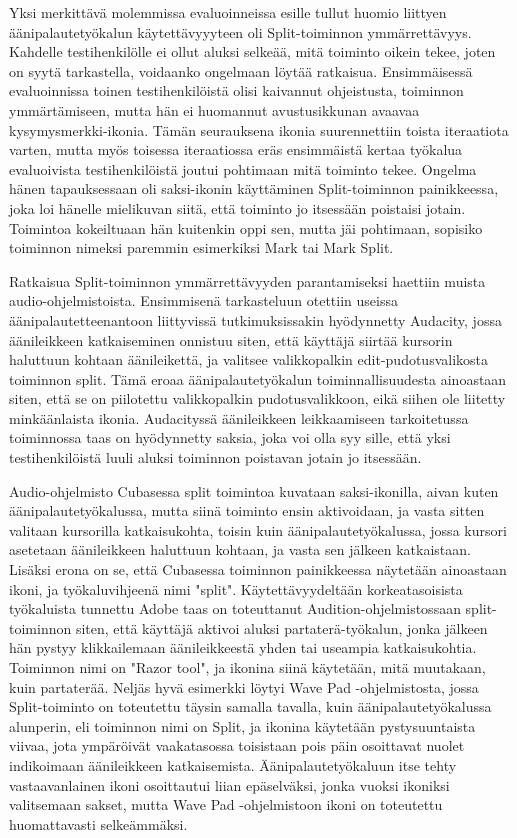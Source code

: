 \documentclass[utf8]{gradu3}
\begin{document}
Yksi merkittävä molemmissa evaluoinneissa esille tullut huomio liittyen äänipalautetyökalun käytettävyyyteen oli Split-toiminnon ymmärrettävyys. Kahdelle testihenkilölle ei ollut aluksi selkeää, mitä toiminto oikein tekee, joten on syytä tarkastella, voidaanko ongelmaan löytää ratkaisua. Ensimmäisessä evaluoinnissa toinen testihenkilöistä olisi kaivannut ohjeistusta, toiminnon ymmärtämiseen, mutta hän ei huomannut avustusikkunan avaavaa kysymysmerkki-ikonia. Tämän seurauksena ikonia suurennettiin toista iteraatiota varten, mutta myös toisessa iteraatiossa eräs ensimmäistä kertaa työkalua evaluoivista testihenkilöistä joutui pohtimaan mitä toiminto tekee. Ongelma hänen tapauksessaan oli saksi-ikonin käyttäminen Split-toiminnon painikkeessa, joka loi hänelle mielikuvan siitä, että toiminto jo itsessään poistaisi jotain. Toimintoa kokeiltuaan hän kuitenkin oppi sen, mutta jäi pohtimaan, sopisiko toiminnon nimeksi paremmin esimerkiksi Mark tai Mark Split. 

Ratkaisua Split-toiminnon ymmärrettävyyden parantamiseksi haettiin muista audio-ohjelmistoista. Ensimmisenä tarkasteluun otettiin useissa äänipalautetteenantoon liittyvissä tutkimuksissakin hyödynnetty Audacity, jossa äänileikkeen katkaiseminen onnistuu siten, että käyttäjä siirtää kursorin haluttuun kohtaan äänileikettä, ja valitsee valikkopalkin edit-pudotusvalikosta toiminnon split. Tämä eroaa äänipalautetyökalun toiminnallisuudesta ainoastaan siten, että se on piilotettu valikkopalkin pudotusvalikkoon, eikä siihen ole liitetty minkäänlaista ikonia. Audacityssä äänileikkeen leikkaamiseen tarkoitetussa toiminnossa taas on hyödynnetty saksia, joka voi olla syy sille, että yksi testihenkilöistä luuli aluksi toiminnon poistavan jotain jo itsessään.  

Audio-ohjelmisto Cubasessa split toimintoa kuvataan saksi-ikonilla, aivan kuten äänipalautetyökalussa, mutta siinä toiminto ensin aktivoidaan, ja vasta sitten valitaan kursorilla katkaisukohta, toisin kuin äänipalautetyökalussa, jossa kursori asetetaan äänileikkeen haluttuun kohtaan, ja vasta sen jälkeen katkaistaan. Lisäksi erona on se, että Cubasessa toiminnon painikkeessa näytetään ainoastaan ikoni, ja työkaluvihjeenä nimi "split". Käytettävyydeltään korkeatasoisista työkaluista tunnettu Adobe taas on toteuttanut Audition-ohjelmistossaan split-toiminnon siten, että käyttäjä aktivoi aluksi partaterä-työkalun, jonka jälkeen hän pystyy klikkailemaan äänileikkeestä yhden tai useampia katkaisukohtia. Toiminnon nimi on "Razor tool", ja ikonina siinä käytetään, mitä muutakaan, kuin partaterää. Neljäs hyvä esimerkki löytyi Wave Pad -ohjelmistosta, jossa Split-toiminto on toteutettu täysin samalla tavalla, kuin äänipalautetyökalussa alunperin, eli toiminnon nimi on Split, ja ikonina käytetään pystysuuntaista viivaa, jota ympäröivät vaakatasossa toisistaan pois päin osoittavat nuolet indikoimaan äänileikkeen katkaisemista. Äänipalautetyökaluun itse tehty vastaavanlainen ikoni osoittautui liian epäselväksi, jonka vuoksi ikoniksi valitsemaan sakset, mutta Wave Pad -ohjelmistoon ikoni on toteutettu huomattavasti selkeämmäksi. 
\end{document}
